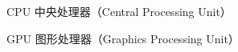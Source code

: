 
\begin{denotation}[3cm]
  \item[CPU] 中央处理器（Central Processing Unit）
  \item[GPU] 图形处理器（Graphics Processing Unit）

\end{denotation}
